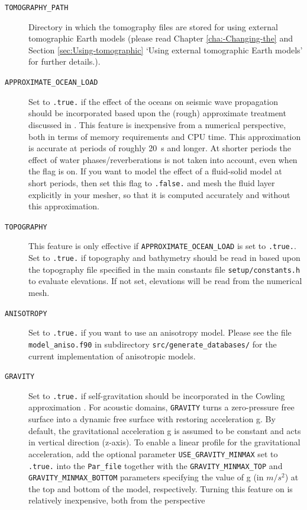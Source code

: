 \begin{description}
\item [{\texttt{TOMOGRAPHY\_PATH}}] Directory in which the tomography files
are stored for using external tomographic Earth models (please read
Chapter \ref{cha:-Changing-the} and Section \ref{sec:Using-tomographic}
`Using external tomographic Earth models' for further details.).
%
\item [{\texttt{APPROXIMATE\_OCEAN\_LOAD}}] Set to \texttt{.true.} if the
effect of the oceans on seismic wave propagation should be incorporated
based upon the (rough) approximate treatment discussed in \citet{KoTr02b}.
This feature is inexpensive from a numerical perspective, both in
terms of memory requirements and CPU time. This approximation is accurate
at periods of roughly 20~s and longer. At shorter periods the effect
of water phases/reverberations is not taken into account, even when
the flag is on. If you want to model the effect of a fluid-solid model
at short periods, then set this flag to \texttt{.false.} and mesh
the fluid layer explicitly in your mesher, so that it is computed
accurately and without this approximation.
%
\item [{\texttt{TOPOGRAPHY}}] This feature is only effective if \texttt{APPROXIMATE\_OCEAN\_LOAD}
is set to \texttt{.true.}. Set to \texttt{.true.} if topography and
bathymetry should be read in based upon the topography file specified
in the main constants file \texttt{setup/constants.h} to evaluate elevations. If not set, elevations
will be read from the numerical mesh.
%
\item [{\texttt{ANISOTROPY}}] Set to \texttt{.true.} if you want to use
an anisotropy model. Please see the file \texttt{model\_aniso.f90}
in subdirectory \texttt{src/generate\_databases/} for the current
implementation of anisotropic models.
%
\item [{\texttt{GRAVITY}}] Set to \texttt{.true.} if self-gravitation should
be incorporated in the Cowling approximation \citep{KoTr02b,DaTr98}.
For acoustic domains, \texttt{GRAVITY} turns a zero-pressure free surface into a dynamic free surface
with restoring acceleration g.
By default, the gravitational acceleration g is assumed to be constant and acts in vertical direction (z-axis).
To enable a linear profile for the gravitational acceleration, add the optional parameter \texttt{USE\_GRAVITY\_MINMAX} set to \texttt{.true.}
into the \texttt{Par_file} together with the \texttt{GRAVITY\_MINMAX\_TOP} and \texttt{GRAVITY\_MINMAX\_BOTTOM} parameters
specifying the value of g (in $m/s^2$) at the top and bottom of the model, respectively.
Turning this feature on is relatively inexpensive, both from the perspective

\end{description}
